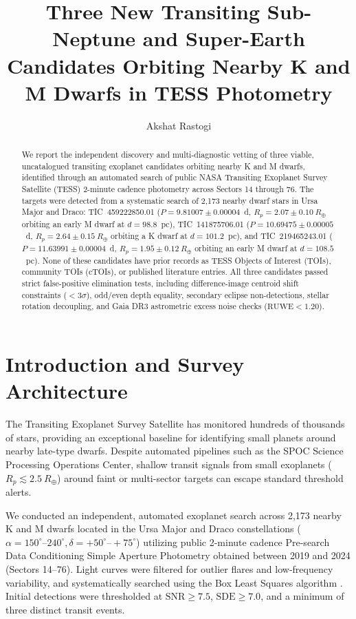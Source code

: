 ﻿\documentclass[modern]{aastex631}
\newcommand{\rearth}{R_\oplus}
\begin{document}
\title{Three New Transiting Sub-Neptune and Super-Earth Candidates Orbiting Nearby K and M Dwarfs in TESS Photometry}

\author[0009-0000-0000-0000]{Akshat Rastogi}
\noaffiliation
{}


\begin{abstract}
We report the independent discovery and multi-diagnostic vetting of three viable, uncatalogued transiting exoplanet candidates orbiting nearby K and M dwarfs, identified through an automated search of public NASA Transiting Exoplanet Survey Satellite (TESS) 2-minute cadence photometry across Sectors 14 through 76. The targets were detected from a systematic search of 2,173 nearby dwarf stars in Ursa Major and Draco: TIC~459222850.01 ($P = 9.81007 \pm 0.00004$~d, $R_p = 2.07 \pm 0.10~\rearth$ orbiting an early M dwarf at $d = 98.8$~pc), TIC~141875706.01 ($P = 10.69475 \pm 0.00005$~d, $R_p = 2.64 \pm 0.15~\rearth$ orbiting a K dwarf at $d = 101.2$~pc), and TIC~219465243.01 ($P = 11.63991 \pm 0.00004$~d, $R_p = 1.95 \pm 0.12~\rearth$ orbiting an early M dwarf at $d = 108.5$~pc). None of these candidates have prior records as TESS Objects of Interest (TOIs), community TOIs (cTOIs), or published literature entries. All three candidates passed strict false-positive elimination tests, including difference-image centroid shift constraints ($<3\sigma$), odd/even depth equality, secondary eclipse non-detections, stellar rotation decoupling, and Gaia DR3 astrometric excess noise checks ($\mathrm{RUWE} < 1.20$).
\end{abstract}

\section{Introduction and Survey Architecture}
The Transiting Exoplanet Survey Satellite \citep[TESS;][]{Ricker2015} has monitored hundreds of thousands of stars, providing an exceptional baseline for identifying small planets around nearby late-type dwarfs. Despite automated pipelines such as the SPOC Science Processing Operations Center, shallow transit signals from small exoplanets ($R_p \lesssim 2.5~\rearth$) around faint or multi-sector targets can escape standard threshold alerts.

We conducted an independent, automated exoplanet search across 2,173 nearby K and M dwarfs located in the Ursa Major and Draco constellations ($\alpha = 150^\circ\text{--}240^\circ, \delta = +50^\circ\text{--}+75^\circ$) utilizing public 2-minute cadence Pre-search Data Conditioning Simple Aperture Photometry \citep[PDCSAP;][]{Stassun2019} obtained between 2019 and 2024 (Sectors 14--76). Light curves were filtered for outlier flares and low-frequency variability, and systematically searched using the Box Least Squares algorithm \citep[BLS;][]{Kovacs2002}. Initial detections were thresholded at $\mathrm{SNR} \ge 7.5$, $\mathrm{SDE} \ge 7.0$, and a minimum of three distinct transit events.
\end{document}
